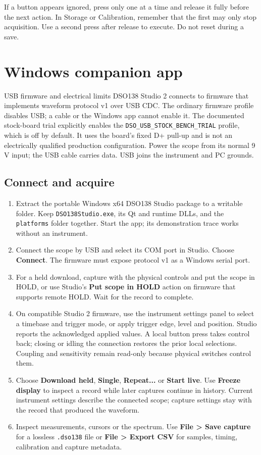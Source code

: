 \documentclass[10pt,a4paper]{article}
\newcommand{\key}[1]{\mbox{\fcolorbox{line}{white}{\strut\footnotesize\bfseries #1}}}
\newcommand{\manualpage}[2]{\clearpage\section{#1}\label{#2}}
\begin{document}
If a button appears ignored, press only one at a time and release it fully before the next action. In Storage or Calibration, remember that the first \key{OK} may only stop acquisition. Use a second press after release to execute. Do not reset during a save.

\manualpage{Windows companion app}{usb}

\begin{manualnote}{USB firmware and electrical limits}
DSO138 Studio 2 connects to firmware that implements waveform protocol v1 over USB CDC. The ordinary firmware profile disables USB; a cable or the Windows app cannot enable it. The documented stock-board trial explicitly enables the \texttt{DSO\_USB\_STOCK\_BENCH\_TRIAL} profile, which is off by default. It uses the board's fixed D+ pull-up and is not an electrically qualified production configuration. Power the scope from its normal 9\,V input; the USB cable carries data. USB joins the instrument and PC grounds.
\end{manualnote}

\subsection*{Connect and acquire}
\begin{enumerate}
\item Extract the portable Windows x64 DSO138 Studio package to a writable folder. Keep \texttt{DSO138Studio.exe}, its Qt and runtime DLLs, and the \texttt{platforms} folder together. Start the app; its demonstration trace works without an instrument.
\item Connect the scope by USB and select its COM port in Studio. Choose \textbf{Connect}. The firmware must expose protocol v1 as a Windows serial port.
\item For a held download, capture with the physical controls and put the scope in HOLD, or use Studio's \textbf{Put scope in HOLD} action on firmware that supports remote HOLD. Wait for the record to complete.
\item On compatible Studio 2 firmware, use the instrument settings panel to select a timebase and trigger mode, or apply trigger edge, level and position. Studio reports the acknowledged applied values. A local button press takes control back; closing or idling the connection restores the prior local selections. Coupling and sensitivity remain read-only because physical switches control them.
\item Choose \textbf{Download held}, \textbf{Single}, \textbf{Repeat...} or \textbf{Start live}. Use \textbf{Freeze display} to inspect a record while later captures continue in history. Current instrument settings describe the connected scope; capture settings stay with the record that produced the waveform.
\item Inspect measurements, cursors or the spectrum. Use \textbf{File > Save capture} for a lossless \texttt{.dso138} file or \textbf{File > Export CSV} for samples, timing, calibration and capture metadata.
\end{enumerate}
\end{document}
